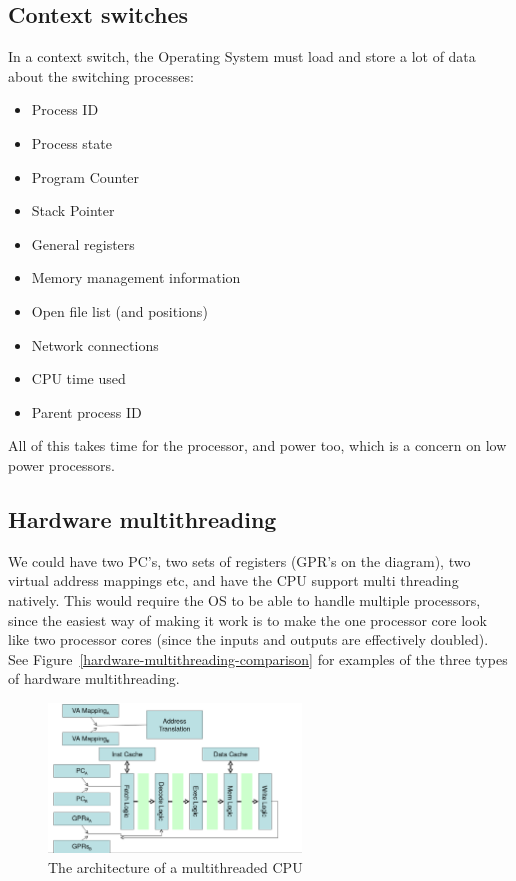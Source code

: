 \subsection{Context switches}

In a context switch, the Operating System must load and store a lot of data
about the switching processes:

\begin{mymulticols}
  \begin{itemize}
    \item Process ID
    \item Process state
    \item Program Counter
    \item Stack Pointer
    \item General registers
    \item Memory management information
    \item Open file list (and positions)
    \item Network connections
    \item CPU time used
    \item Parent process ID
  \end{itemize}
\end{mymulticols}

All of this takes time for the processor, and power too, which is a concern on
low power processors.

\subsection{Hardware multithreading}

We could have two PC's, two sets of registers (GPR's on the diagram), two
virtual address mappings etc, and have the CPU support multi threading natively.
This would require the OS to be able to handle multiple processors, since the
easiest way of making it work is to make the one processor core look like two
processor cores (since the inputs and outputs are effectively doubled). See
Figure~\ref{hardware-multithreading-comparison} for examples of the three types
of hardware multithreading.

\begin{figure}[H]
  \centering
  \includegraphics[width=0.6\textwidth]{images/hyperthreading}
  \caption{The architecture of a multithreaded CPU}
  \label{hyperthreading}
\end{figure}

